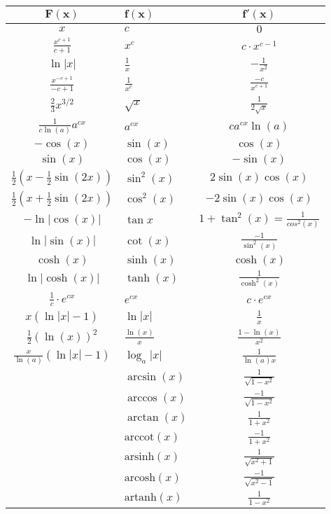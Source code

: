\begin{center}
  \begin{tabularx}{\linewidth}{c>{\centering\arraybackslash}Xc}
  \toprule
  $\mathbf{F(x)}$ & $\mathbf{f(x)}$ & $\mathbf{f'(x)}$ \\
  \midrule
  $x$ & $c$ & $0$ \\[3px]
  $\frac{x^{c+1}}{c+1}$ & $x^c$ & $c \cdot x^{c-1}$ \\[3px]
  $\ln |x|$ & $\frac{1}{x}$ & $-\frac{1}{x^2}$ \\[3px]
  $\frac{x^{-c+1}}{-c+1}$ & $\frac{1}{x^c}$ & $\frac{-c}{x^{c+1}}$ \\[3px]
  $\frac{2}{3}x^{3/2}$ & $\sqrt{x}$ & $\frac{1}{2\sqrt{x}}$\\[3px]
  $\frac{1}{c \ln(a)}a^{cx}$ & $a^{cx}$ & $ca^{cx} \ln(a)$ \\[3px]
  $-\cos(x)$ & $\sin(x)$ & $\cos(x)$ \\[3px]
  $\sin(x)$ & $\cos(x)$ & $-\sin(x)$ \\[3px]
  $\frac{1}{2}(x-\frac{1}{2}\sin(2x))$ & $\sin^2(x)$ & $2 \sin(x)\cos(x)$ \\[3px]
  $\frac{1}{2}(x + \frac{1}{2}\sin(2x))$ & $\cos^2(x)$ & $-2\sin(x)\cos(x)$ \\[3px]
  $-\ln|\cos(x)|$ & $\tan{x}$ & $1+\tan^2(x)=\frac{1}{cos^2(x)}$\\[3px]
  $\ln | \sin(x)|$ & $\cot(x)$ & $\frac{-1}{\sin^2(x)}$ \\[3px]
  $\cosh(x)$ & $\sinh(x)$ & $\cosh(x)$ \\[3px]
  $\ln|\cosh(x)|$ & $\tanh(x)$ & $\frac{1}{\cosh^2(x)}$ \\[3px]
  $\frac{1}{c} \cdot e^{cx}$ & $e^{cx}$ & $c \cdot e^{cx}$ \\[3px]
  $x(\ln |x| - 1)$ & $\ln |x|$ & $\frac{1}{x}$ \\[3px]
  $\frac{1}{2}(\ln(x))^2$ & $\frac{\ln(x)}{x}$ & $\frac{1 - \ln(x)}{x^2}$ \\[3px]
  $\frac{x}{\ln(a)} (\ln|x| -1)$ & $\log_a |x|$ & $\frac{1}{\ln(a)x}$ \\[3px]
  $ $ & $\arcsin(x)$ & $\frac{1}{\sqrt{1-x^2}}$ \\[3px]
  $ $ & $\arccos(x)$ & $\frac{-1}{\sqrt{1-x^2}}$ \\[3px]
  $ $ & $\arctan(x)$ & $\frac{1}{1+x^2}$ \\[3px]
  $ $ & $\text{arccot}(x)$ & $\frac{-1}{1+x^2}$ \\[3px]
  $ $ & $\text{arsinh}(x)$ & $\frac{1}{\sqrt{x^2+1}}$ \\[3px]
  $ $ & $\text{arcosh}(x)$ & $\frac{-1}{\sqrt{x^2-1}}$ \\[3px]
  $ $ & $\text{artanh}(x)$ & $\frac{1}{1-x^2}$ \\[3px]
  \bottomrule
  \end{tabularx}
\end{center}


